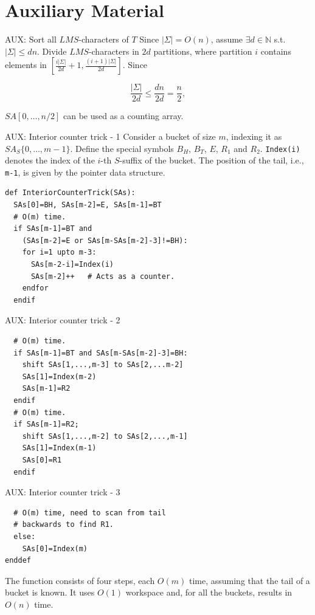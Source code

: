 \documentclass{beamer}
\begin{document}
  \section{Auxiliary Material}
  \begin{frame}{AUX: Sort all $LMS$-characters of $T$}\label{AUX1}
    Since $|\Sigma| = O(n)$, assume $\exists d \in \mathbb{N}$ s.t. $|\Sigma| \le dn$. Divide $LMS$-characters in $2d$ partitions, where partition $i$ contains elements in $\left[ \frac{i|\Sigma|}{2d} +1, \frac{(i+1)|\Sigma|}{2d} \right]$. Since

    $$\frac{|\Sigma|}{2d} \le \frac{dn}{2d} = \frac{n}{2},$$

    $SA[0, \dots, n/2]$ can be used as a counting array. \hyperlink{1}{\beamerbutton{$\hookleftarrow$}}
  \end{frame}

  \begin{frame}[fragile]{AUX: Interior counter trick - 1}\label{AUX5.counter}
    Consider a bucket of size $m$, indexing it as $SA_S \{0, \dots, m-1 \}$. Define the special symbols $B_H$, $B_T$, $E$, $R_1$ and $R_2$. \texttt{Index(i)} denotes the index of the $i$-th $S$-suffix of the bucket. The position of the tail, i.e., \texttt{m-1}, is given by the pointer data structure.
    \begin{lstlisting}
def InteriorCounterTrick(SAs):
  SAs[0]=BH, SAs[m-2]=E, SAs[m-1]=BT
  # O(m) time.
  if SAs[m-1]=BT and
    (SAs[m-2]=E or SAs[m-SAs[m-2]-3]!=BH):
    for i=1 upto m-3:
      SAs[m-2-i]=Index(i)
      SAs[m-2]++   # Acts as a counter.
    endfor
  endif
    \end{lstlisting}
  \end{frame}

  \begin{frame}[fragile]{AUX: Interior counter trick - 2}
    \begin{lstlisting}
  # O(m) time.
  if SAs[m-1]=BT and SAs[m-SAs[m-2]-3]=BH:
    shift SAs[1,...,m-3] to SAs[2,...m-2]
    SAs[1]=Index(m-2)
    SAs[m-1]=R2
  endif
  # O(m) time.
  if SAs[m-1]=R2;
    shift SAs[1,...,m-2] to SAs[2,...,m-1]
    SAs[1]=Index(m-1)
    SAs[0]=R1
  endif
    \end{lstlisting}
  \end{frame}

  \begin{frame}[fragile]{AUX: Interior counter trick - 3}

    \begin{lstlisting}
  # O(m) time, need to scan from tail
  # backwards to find R1.
  else:
    SAs[0]=Index(m)
enddef
    \end{lstlisting}

    The function consists of four steps, each $O(m)$ time, assuming that the tail of a bucket is known. It uses $O(1)$ workspace and, for all the buckets, results in $O(n)$ time. \hyperlink{5}{\beamerbutton{$\hookleftarrow$}}

  \end{frame}
\end{document}
